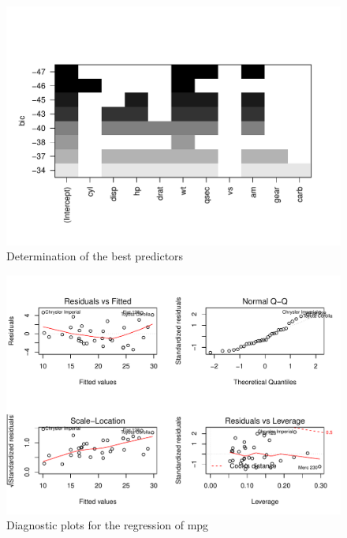 \documentclass[a4paper, 11pt]{article}\usepackage[]{graphicx}\usepackage[]{color}
\makeatletter
\def\maxwidth{ %
  \ifdim\Gin@nat@width>\linewidth
    \linewidth
  \else
    \Gin@nat@width
  \fi
}
\newenvironment{knitrout}{}{} %
\makeatother
\begin{document}
\begin{knitrout}
\color{fgcolor}\begin{figure}
\includegraphics[width=\maxwidth]{figure/leaps-1} \caption[Determination of the best predictors]{Determination of the best predictors}\label{fig:leaps}
\end{figure}


\end{knitrout}
\begin{knitrout}
\color{fgcolor}\begin{figure}[!h]
\includegraphics[width=\maxwidth]{figure/verif-1} \caption[Diagnostic plots for the regression of mpg]{Diagnostic plots for the regression of mpg}\label{fig:verif}
\end{figure}


\end{knitrout}
\end{document}
